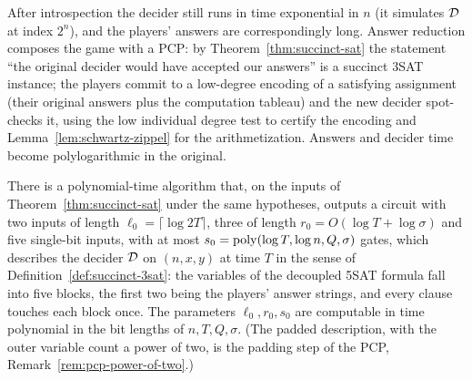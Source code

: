 After introspection the decider still runs in time exponential in $n$ (it simulates
$\mathcal{D}$ at index $2^n$), and the players' answers are correspondingly long. Answer
reduction composes the game with a PCP: by Theorem~\ref{thm:succinct-sat} the
statement ``the original decider would have accepted our answers'' is a succinct 3SAT
instance; the players commit to a low-degree encoding of a satisfying assignment
(their original answers plus the computation tableau) and the new decider spot-checks
it, using the low individual degree test to certify the encoding and
Lemma~\ref{lem:schwartz-zippel} for the arithmetization. Answers and decider time
become polylogarithmic in the original.

\begin{lemma}
\label{lem:decoupled-5sat}
\leanok
There is a polynomial-time algorithm that, on the inputs of
Theorem~\ref{thm:succinct-sat} under the same hypotheses, outputs a circuit with two inputs
of length $\ell_0 = \lceil \log 2T \rceil$, three of length $r_0 = O(\log T + \log
\sigma)$ and five single-bit inputs, with at most $s_0 = \mathrm{poly}(\log T, \log n, Q, \sigma)$
gates, which describes the decider $\mathcal{D}$ on $(n, x, y)$ at time $T$ in the sense of
Definition~\ref{def:succinct-3sat}: the variables of the decoupled 5SAT formula fall into
five blocks, the first two being the players' answer strings, and every clause touches
each block once. The parameters $\ell_0, r_0, s_0$ are computable in time polynomial in
the bit lengths of $n, T, Q, \sigma$. (The padded description, with the outer variable
count a power of two, is the padding step of the PCP, Remark~\ref{rem:pcp-power-of-two}.)
\end{lemma}

